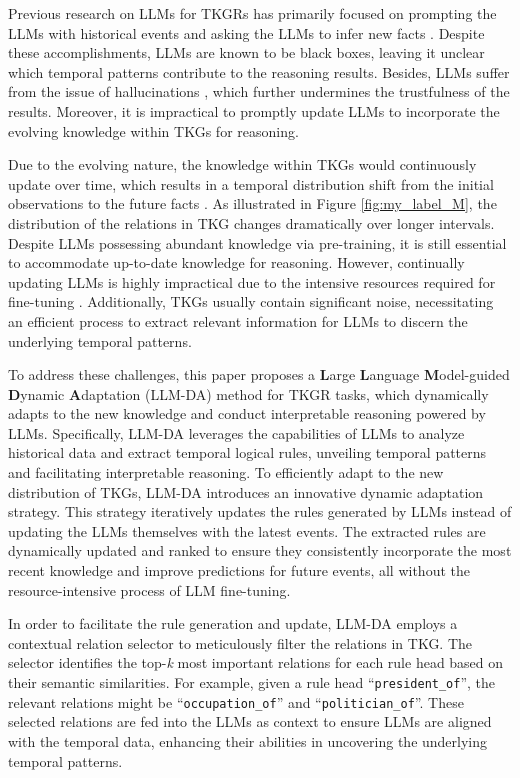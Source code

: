 \documentclass{article}
\begin{document}
Previous research on LLMs for TKGRs has primarily focused on prompting the LLMs with historical events and asking the LLMs to infer new facts \citep{xu2023pre, xia2024enhancing, luo2024chain}. Despite these accomplishments, LLMs are known to be black boxes, leaving it unclear which temporal patterns contribute to the reasoning results. Besides, LLMs suffer from the issue of hallucinations \citep{huang2023survey}, which further undermines the trustfulness of the results. Moreover, it is impractical to promptly update LLMs to incorporate the evolving knowledge within TKGs for reasoning.

Due to the evolving nature, the knowledge within TKGs would continuously update over time, which results in a temporal distribution shift from the initial observations to the future facts \citep{wang2022learning, cormode2009forward}. As illustrated in Figure \ref{fig:my_label_M}, the distribution of the relations in TKG changes dramatically over longer intervals. Despite LLMs possessing abundant knowledge via pre-training, it is still essential to accommodate up-to-date knowledge for reasoning. However, continually updating LLMs is highly impractical due to the intensive resources required for fine-tuning \citep{wu2024continual}. Additionally, TKGs usually contain significant noise, necessitating an efficient process to extract relevant information for LLMs to discern the underlying temporal patterns.

To address these challenges, this paper proposes a \textbf{L}arge \textbf{L}anguage \textbf{M}odel-guided \textbf{D}ynamic \textbf{A}daptation (LLM-DA) method for TKGR tasks, which dynamically adapts to the new knowledge and conduct interpretable reasoning powered by LLMs.
Specifically, LLM-DA leverages the capabilities of LLMs to analyze historical data and extract temporal logical rules, unveiling temporal patterns and facilitating interpretable reasoning.
To efficiently adapt to the new distribution of TKGs, LLM-DA introduces an innovative dynamic adaptation strategy. This strategy iteratively updates the rules generated by LLMs instead of updating the LLMs themselves with the latest events. The extracted rules are dynamically updated and ranked to ensure they consistently incorporate the most recent knowledge and improve predictions for future events, all without the resource-intensive process of LLM fine-tuning.

In order to facilitate the rule generation and update, LLM-DA employs a contextual relation selector to meticulously filter the relations in TKG. The selector identifies the top-\textit{k} most important relations for each rule head based on their semantic similarities. For example, given a rule head ``\texttt{president\_of}'', the relevant relations might be ``\texttt{occupation\_of}'' and ``\texttt{politician\_of}''.
These selected relations are fed into the LLMs as context to ensure LLMs are aligned with the temporal data, enhancing their abilities in uncovering the underlying temporal patterns.
\end{document}
